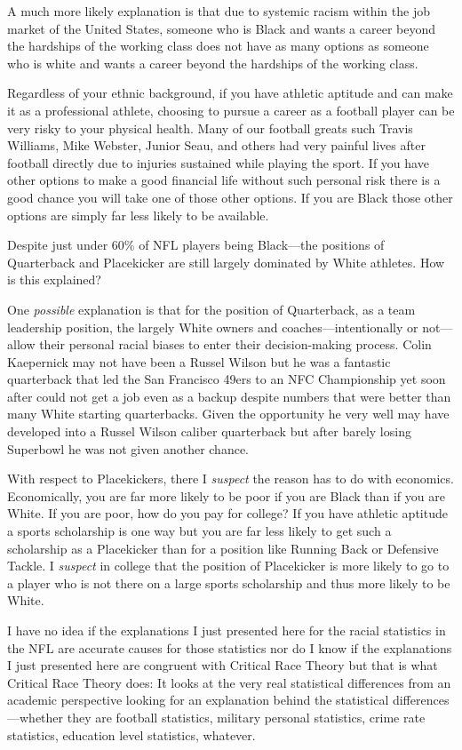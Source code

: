 A much more likely explanation is that due to systemic racism within the job market of the United States, someone who is Black and wants a career beyond the hardships of the working class does not have as many options as someone who is white and wants a career beyond the hardships of the working class.

Regardless of your ethnic background, if you have athletic aptitude and can make it as a professional athlete, choosing to pursue a career as a football player can be very risky to your physical health. Many of our football greats such Travis Williams, Mike Webster, Junior Seau, and others had very painful lives after football directly due to injuries sustained while playing the sport. If you have other options to make a good financial life without such personal risk there is a good chance you will take one of those other options. If you are Black those other options are simply far less likely to be available.

Despite just under 60\% of NFL players being Black---the positions of Quarterback and Placekicker are still largely dominated by White athletes. How is this explained?

One \emph{possible} explanation is that for the position of Quarterback, as a team leadership position, the largely White owners and coaches---intentionally or not---allow their personal racial biases to enter their decision-making process. Colin Kaepernick may not have been a Russel Wilson but he was a fantastic quarterback that led the San Francisco 49ers to an NFC Championship yet soon after could not get a job even as a backup despite numbers that were better than many White starting quarterbacks. Given the opportunity he very well may have developed into a Russel Wilson caliber quarterback but after barely losing Superbowl  he was not given another chance.

With respect to Placekickers, there I \emph{suspect} the reason has to do with economics. Economically, you are far more likely to be poor if you are Black than if you are White. If you are poor, how do you pay for college? If you have athletic aptitude a sports scholarship is one way but you are far less likely to get such a scholarship as a Placekicker than for a position like Running Back or Defensive Tackle. I \emph{suspect} in college that the position of Placekicker is more likely to go to a player who is not there on a large sports scholarship and thus more likely to be White.

I have no idea if the explanations I just presented here for the racial statistics in the NFL are accurate causes for those statistics nor do I know if the explanations I just presented here are congruent with Critical Race Theory but that is what Critical Race Theory does: It looks at the very real statistical differences from an academic perspective looking for an explanation behind the statistical differences---whether they are football statistics, military personal statistics, crime rate statistics, education level statistics, whatever.

